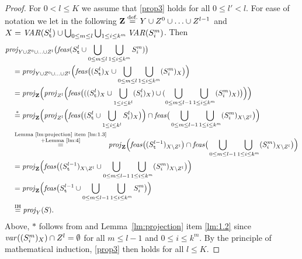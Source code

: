 \begin{proof}
For $0<l\leq K$ we assume that \eqref{prop3} holds for all $0\leq l'<l$. For ease of notation we let in the following $\mathbf{Z} \overset{\text{def.}}= Y\cup Z^0\cup\ldots\cup Z^{l-1}$ and $X = \mathit{VAR}(S^l_{\texttt{t}})\cup \bigcup_{0\leq m\leq l}\bigcup_{1\leq i\leq k^m}\mathit{VAR}(S^m_i)$. Then 
\begin{align*}
&\mathit{proj}_{Y\cup Z^0\cup\ldots\cup Z^l}\big(\mathit{feas}(S^l_{\texttt{t}}\cup\bigcup_{0\leq m\leq l}\bigcup_{1\leq i\leq k^m} S^m_i)\big)\\
&\quad=\mathit{proj}_{Y\cup Z^0\cup\ldots\cup Z^l}\Big(\mathit{feas}\big((S^l_{\texttt{t}})_X\cup\bigcup_{0\leq m\leq l}\bigcup_{1\leq i\leq k^m} (S^m_i)_X\big)\Big)\\
&\quad=\mathit{proj}_{\mathbf{Z}}\Big(\mathit{proj}_{Z^l}\Big(\mathit{feas}\big(((S^l_{\texttt{t}})_X\cup\bigcup_{1\leq i\leq k^l} (S_i^l)_X)\cup(\bigcup_{0\leq m\leq l-1}\bigcup_{1\leq i\leq k^m} (S^m_i)_X)\big)\Big)\Big)\\
&\quad\overset{*}=\mathit{proj}_{\mathbf{Z}}\Big(\mathit{proj}_{Z^l}\Big(\mathit{feas}\big((S^l_{\texttt{t}}\cup\bigcup_{1\leq i\leq k^l} S_i^l)_X\big)\Big)\cap\mathit{feas}\big(\bigcup_{0\leq m\leq l-1}\bigcup_{1\leq i\leq k^m} (S^m_i)_{X\setminus Z^l}\big)\Big)\\
&\quad\overset{\substack{\text{Lemma~\ref{lm:projection} item \ref{lm:1.3}}\\+\text{Lemma~\ref{lm:4}}}}
=\mathit{proj}_{\mathbf{Z}}\Big(\mathit{feas}\big((S^{l-1}_\texttt{t})_{X\setminus Z^l}\big)\cap\mathit{feas}\big(\bigcup_{0\leq m\leq l-1}\bigcup_{1\leq i\leq k^m} (S^m_i)_{X\setminus Z^l}\big)\Big)\\
&\quad=\mathit{proj}_{\mathbf{Z}}\Big(\mathit{feas}\big((S^{l-1}_{\texttt{t}})_{X\setminus Z^l}\cup\bigcup_{0\leq m\leq l-1}\bigcup_{1\leq i\leq k^m} (S^m_i)_{X\setminus Z^l}\big)\Big)\\
&\quad=\mathit{proj}_{\mathbf{Z}}\Big(\mathit{feas}\big(S^{l-1}_{\texttt{t}}\cup\bigcup_{0\leq m\leq l-1}\bigcup_{1\leq i\leq k^m} S^m_i\big)\Big)\\
&\quad\overset{\text{IH}}=\mathit{proj}_{Y}(S).
\end{align*}
Above, $*$ follows from and Lemma~\ref{lm:projection} item \ref{lm:1.2} since $\mathit{var}((S^m_i)_X)\cap Z^l = \emptyset$ for all $m\leq l-1$ and $0\leq i\leq k^m$.
By the principle of mathematical induction, \eqref{prop3} then holds for all $l\leq K$. 
\end{proof}

